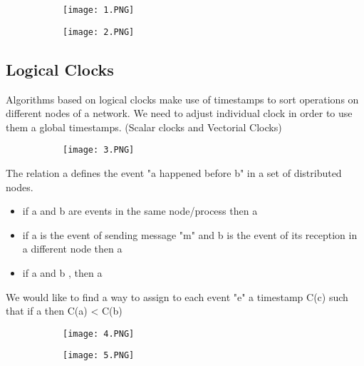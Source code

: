 \documentclass{article}
\begin{document}
\begin{figure}[ht!]
  \centering
  \begin{subfigure}[b]{0.49\linewidth}
    \texttt{[image: 1.PNG]}
  \end{subfigure}
  \begin{subfigure}[b]{0.5\textwidth}
         \centering
         \texttt{[image: 2.PNG]}
     \end{subfigure}
\end{figure}

\subsection{Logical Clocks}

Algorithms based on logical clocks make use of timestamps to sort operations on different nodes of a network. We need to adjust individual clock in order to use them a global timestamps. (Scalar clocks and Vectorial Clocks)

\begin{figure}[ht!]
  \centering
  \begin{subfigure}[b]{0.3\linewidth}
    \texttt{[image: 3.PNG]}
  \end{subfigure}
\end{figure}

The relation a  defines the event "a happened before b" in a set of distributed nodes.
\begin{itemize}
    \item if a and b are events in the same node/process then a 
    \item if a is the event of sending message "m" and b is the event of its reception in a different node then a 
    \item if a  and b , then a 
\end{itemize}
We would like to find a way to assign to each event "e" a timestamp C(c) such that if a  then C(a) < C(b)


\begin{figure}[ht!]
  \centering
  \begin{subfigure}[b]{0.39\linewidth}
    \texttt{[image: 4.PNG]}
  \end{subfigure}
  \begin{subfigure}[b]{0.4\textwidth}
         \centering
         \texttt{[image: 5.PNG]}
     \end{subfigure}
\end{figure}
\end{document}
